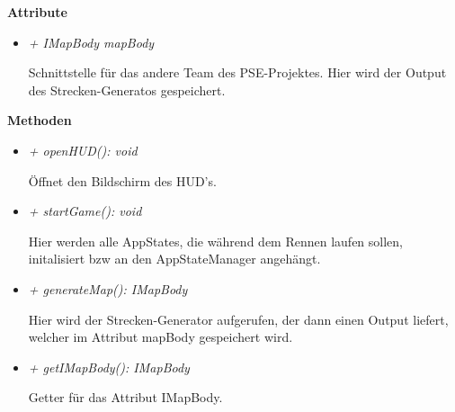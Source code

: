             \textbf{Attribute}
            \begin{itemize}
                \item \textit{+ IMapBody mapBody}  
                    \begin{leftbar}[0.9\linewidth]
                        Schnittstelle für das andere Team des PSE-Projektes.
                        Hier wird der Output des Strecken-Generatos gespeichert.
                    \end{leftbar}
            \end{itemize}
               
            \textbf{Methoden}					
            \begin{itemize}
                \item  \textit{+ openHUD(): void} 
                    \begin{leftbar}[0.9\linewidth]
                        Öffnet den Bildschirm des HUD's.\\
                    \end{leftbar}
                \item  \textit{+ startGame(): void} 
                    \begin{leftbar}[0.9\linewidth]
                        Hier werden alle AppStates, die während dem Rennen 
                        laufen sollen, initalisiert bzw an den AppStateManager
                        angehängt.
                    \end{leftbar}
                \item  \textit{+ generateMap(): IMapBody} 
                    \begin{leftbar}[0.9\linewidth]
                        Hier wird der Strecken-Generator aufgerufen, der dann 
                        einen Output liefert, welcher im Attribut mapBody 
                        gespeichert wird.
                    \end{leftbar}
                \item  \textit{+ getIMapBody(): IMapBody} 
                    \begin{leftbar}[0.9\linewidth]
                        Getter für das Attribut IMapBody.
                    \end{leftbar}
            \end{itemize}

